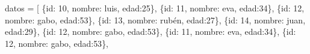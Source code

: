 \documentclass[
  spanish,
  letterpaper,
]{scrbook}
\newenvironment{Shaded}{\begin{snugshade}}{\end{snugshade}}
\newcommand{\DecValTok}[1]{\textcolor[rgb]{0.68,0.00,0.00}{#1}}
\newcommand{\NormalTok}[1]{\textcolor[rgb]{0.00,0.23,0.31}{#1}}
\newcommand{\OperatorTok}[1]{\textcolor[rgb]{0.37,0.37,0.37}{#1}}
\newcommand{\StringTok}[1]{\textcolor[rgb]{0.13,0.47,0.30}{#1}}
\theoremstyle{definition}
\theoremstyle{remark}
\begin{document}
\begin{Shaded}
\begin{Highlighting}[]
\NormalTok{datos }\OperatorTok{=}\NormalTok{ [}
\NormalTok{  \{}\StringTok{\textquotesingle{}id\textquotesingle{}}\NormalTok{: }\DecValTok{10}\NormalTok{, }\StringTok{\textquotesingle{}nombre\textquotesingle{}}\NormalTok{: }\StringTok{\textquotesingle{}luis\textquotesingle{}}\NormalTok{, }\StringTok{\textquotesingle{}edad\textquotesingle{}}\NormalTok{:}\DecValTok{25}\NormalTok{\},}
\NormalTok{  \{}\StringTok{\textquotesingle{}id\textquotesingle{}}\NormalTok{: }\DecValTok{11}\NormalTok{, }\StringTok{\textquotesingle{}nombre\textquotesingle{}}\NormalTok{: }\StringTok{\textquotesingle{}eva\textquotesingle{}}\NormalTok{, }\StringTok{\textquotesingle{}edad\textquotesingle{}}\NormalTok{:}\DecValTok{34}\NormalTok{\},}
\NormalTok{  \{}\StringTok{\textquotesingle{}id\textquotesingle{}}\NormalTok{: }\DecValTok{12}\NormalTok{, }\StringTok{\textquotesingle{}nombre\textquotesingle{}}\NormalTok{: }\StringTok{\textquotesingle{}gabo\textquotesingle{}}\NormalTok{, }\StringTok{\textquotesingle{}edad\textquotesingle{}}\NormalTok{:}\DecValTok{53}\NormalTok{\},}
\NormalTok{  \{}\StringTok{\textquotesingle{}id\textquotesingle{}}\NormalTok{: }\DecValTok{13}\NormalTok{, }\StringTok{\textquotesingle{}nombre\textquotesingle{}}\NormalTok{: }\StringTok{\textquotesingle{}rubén\textquotesingle{}}\NormalTok{, }\StringTok{\textquotesingle{}edad\textquotesingle{}}\NormalTok{:}\DecValTok{27}\NormalTok{\},}
\NormalTok{  \{}\StringTok{\textquotesingle{}id\textquotesingle{}}\NormalTok{: }\DecValTok{14}\NormalTok{, }\StringTok{\textquotesingle{}nombre\textquotesingle{}}\NormalTok{: }\StringTok{\textquotesingle{}juan\textquotesingle{}}\NormalTok{, }\StringTok{\textquotesingle{}edad\textquotesingle{}}\NormalTok{:}\DecValTok{29}\NormalTok{\},}
\NormalTok{  \{}\StringTok{\textquotesingle{}id\textquotesingle{}}\NormalTok{: }\DecValTok{12}\NormalTok{, }\StringTok{\textquotesingle{}nombre\textquotesingle{}}\NormalTok{: }\StringTok{\textquotesingle{}gabo\textquotesingle{}}\NormalTok{, }\StringTok{\textquotesingle{}edad\textquotesingle{}}\NormalTok{:}\DecValTok{53}\NormalTok{\},}
\NormalTok{  \{}\StringTok{\textquotesingle{}id\textquotesingle{}}\NormalTok{: }\DecValTok{11}\NormalTok{, }\StringTok{\textquotesingle{}nombre\textquotesingle{}}\NormalTok{: }\StringTok{\textquotesingle{}eva\textquotesingle{}}\NormalTok{, }\StringTok{\textquotesingle{}edad\textquotesingle{}}\NormalTok{:}\DecValTok{34}\NormalTok{\},}
\NormalTok{  \{}\StringTok{\textquotesingle{}id\textquotesingle{}}\NormalTok{: }\DecValTok{12}\NormalTok{, }\StringTok{\textquotesingle{}nombre\textquotesingle{}}\NormalTok{: }\StringTok{\textquotesingle{}gabo\textquotesingle{}}\NormalTok{, }\StringTok{\textquotesingle{}edad\textquotesingle{}}\NormalTok{:}\DecValTok{53}\NormalTok{\},}

\end{Highlighting}
\end{Shaded}
\end{document}
